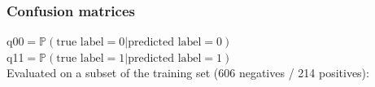 \documentclass[10pt]{article}
\newcommand{\1}{\mathbbm{1}}
\newcommand{\0}{\mathbf{0}}
\begin{document}
\subsubsection*{Confusion matrices}
q00$=\mathbb P(\text{true label}=0 |\text{predicted label} =0)$\\
q11$=\mathbb P(\text{true label}=1 |\text{predicted label} =1)$ \\
Evaluated on a subset of the training set (606 negatives / 214 positives):
\end{document}
